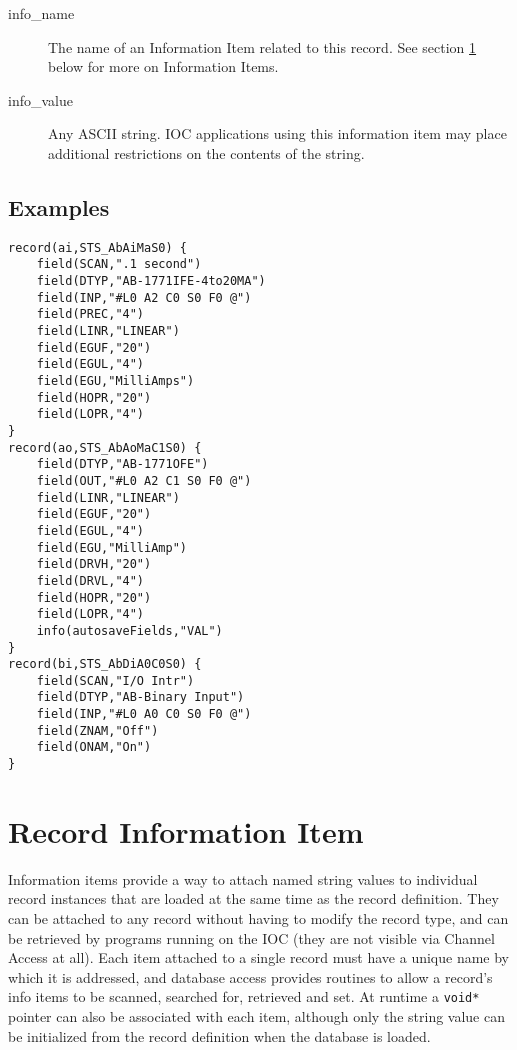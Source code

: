 \begin{description}
\item [info\_name] The name of an Information Item related to this record.
See section \ref{Record Information Item} below for more on Information Items.

\item [info\_value] Any ASCII string.
IOC applications using this information item may place additional restrictions on the contents of the string.

\end{description}

\subsection{Examples}

\begin{verbatim}
record(ai,STS_AbAiMaS0) {
    field(SCAN,".1 second")
    field(DTYP,"AB-1771IFE-4to20MA")
    field(INP,"#L0 A2 C0 S0 F0 @")
    field(PREC,"4")
    field(LINR,"LINEAR")
    field(EGUF,"20")
    field(EGUL,"4")
    field(EGU,"MilliAmps")
    field(HOPR,"20")
    field(LOPR,"4")
}
record(ao,STS_AbAoMaC1S0) {
    field(DTYP,"AB-1771OFE")
    field(OUT,"#L0 A2 C1 S0 F0 @")
    field(LINR,"LINEAR")
    field(EGUF,"20")
    field(EGUL,"4")
    field(EGU,"MilliAmp")
    field(DRVH,"20")
    field(DRVL,"4")
    field(HOPR,"20")
    field(LOPR,"4")
    info(autosaveFields,"VAL")
}
record(bi,STS_AbDiA0C0S0) {
    field(SCAN,"I/O Intr")
    field(DTYP,"AB-Binary Input")
    field(INP,"#L0 A0 C0 S0 F0 @")
    field(ZNAM,"Off")
    field(ONAM,"On")
}
\end{verbatim}

\section{Record Information Item}
\label{Record Information Item}

Information items provide a way to attach named string values to individual record instances that are loaded at the same 
time as the record definition. They can be attached to any record without having to modify the record type, and can be 
retrieved by programs running on the IOC (they are not visible via Channel Access at all). Each item attached to a single 
record must have a unique name by which it is addressed, and database access provides routines to allow a record's info 
items to be scanned, searched for, retrieved and set. At runtime a \verb|void*| pointer can also be associated with each item, 
although only the string value can be initialized from the record definition when the database is loaded.

